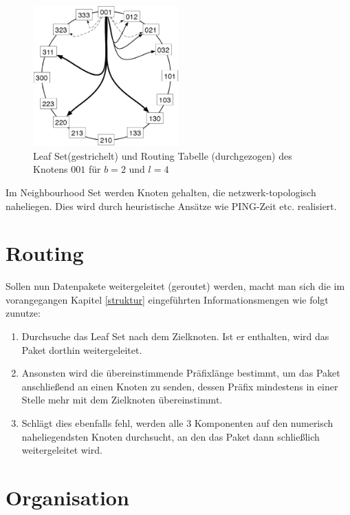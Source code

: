 \begin{figure}[H]
  \centering 
  \includegraphics[width=0.5\textwidth]{../images/pastryPointer}
  \caption[Pastry Pointer]{Leaf Set(gestrichelt) und Routing Tabelle
  (durchgezogen) des Knotens $001$ für $b=2$ und $l=4$ \cite{Schindelhauer2004}}
  \label{pastryPointer}
\end{figure}
Im Neighbourhood Set werden Knoten gehalten, die
netzwerk-topologisch naheliegen. Dies wird durch heuristische Ansätze wie
PING-Zeit etc. realisiert.

\section{Routing}
Sollen nun Datenpakete weitergeleitet (geroutet) werden, macht man sich die im
vorangegangen Kapitel \ref{struktur} eingeführten Informationsmengen wie folgt
zunutze: 
\begin{enumerate}
  \item Durchsuche das Leaf Set nach dem Zielknoten. Ist er enthalten, wird das
  Paket dorthin weitergeleitet.
  \item Ansonsten wird die übereinstimmende Präfixlänge bestimmt, um das Paket
  anschließend an einen Knoten zu senden, dessen Präfix mindestens in einer
  Stelle mehr mit dem Zielknoten übereinstimmt.
  \item Schlägt dies ebenfalls fehl, werden alle 3 Komponenten auf den numerisch
  naheliegendsten Knoten durchsucht, an den das Paket dann schließlich
  weitergeleitet wird.
\end{enumerate}

\section{Organisation}
